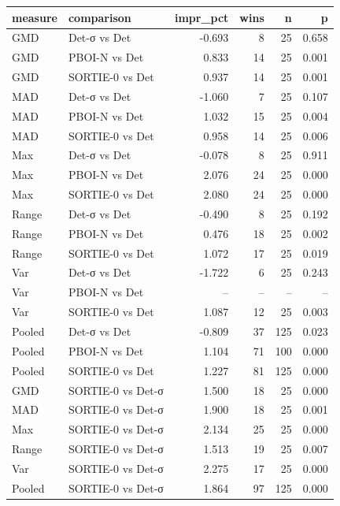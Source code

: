 \begin{tabular}{llrrrr}
\toprule
measure & comparison & impr\_pct & wins & n & p \\
\midrule
GMD & Det-σ vs Det & -0.693 & 8 & 25 & 0.658 \\
GMD & PBOI-N vs Det & 0.833 & 14 & 25 & 0.001 \\
GMD & SORTIE-0 vs Det & 0.937 & 14 & 25 & 0.001 \\
MAD & Det-σ vs Det & -1.060 & 7 & 25 & 0.107 \\
MAD & PBOI-N vs Det & 1.032 & 15 & 25 & 0.004 \\
MAD & SORTIE-0 vs Det & 0.958 & 14 & 25 & 0.006 \\
Max & Det-σ vs Det & -0.078 & 8 & 25 & 0.911 \\
Max & PBOI-N vs Det & 2.076 & 24 & 25 & 0.000 \\
Max & SORTIE-0 vs Det & 2.080 & 24 & 25 & 0.000 \\
Range & Det-σ vs Det & -0.490 & 8 & 25 & 0.192 \\
Range & PBOI-N vs Det & 0.476 & 18 & 25 & 0.002 \\
Range & SORTIE-0 vs Det & 1.072 & 17 & 25 & 0.019 \\
Var & Det-σ vs Det & -1.722 & 6 & 25 & 0.243 \\
Var & PBOI-N vs Det & -- & -- & -- & -- \\
Var & SORTIE-0 vs Det & 1.087 & 12 & 25 & 0.003 \\
Pooled & Det-σ vs Det & -0.809 & 37 & 125 & 0.023 \\
Pooled & PBOI-N vs Det & 1.104 & 71 & 100 & 0.000 \\
Pooled & SORTIE-0 vs Det & 1.227 & 81 & 125 & 0.000 \\
GMD & SORTIE-0 vs Det-σ & 1.500 & 18 & 25 & 0.000 \\
MAD & SORTIE-0 vs Det-σ & 1.900 & 18 & 25 & 0.001 \\
Max & SORTIE-0 vs Det-σ & 2.134 & 25 & 25 & 0.000 \\
Range & SORTIE-0 vs Det-σ & 1.513 & 19 & 25 & 0.007 \\
Var & SORTIE-0 vs Det-σ & 2.275 & 17 & 25 & 0.000 \\
Pooled & SORTIE-0 vs Det-σ & 1.864 & 97 & 125 & 0.000 \\
\bottomrule
\end{tabular}
